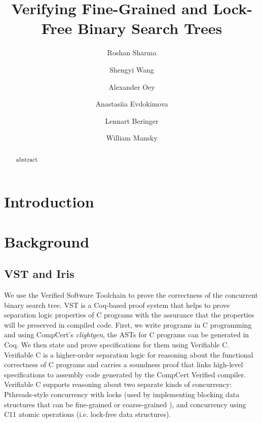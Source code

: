 \documentclass[a4paper,USenglish,cleveref, autoref, thm-restate]{lipics-v2021}
\title{Verifying Fine-Grained and Lock-Free Binary Search Trees}
\author{Roshan Sharma}{University of Illinois at Chicago, USA}{}{}{}
\author{Shengyi Wang}{Princeton University, USA}{}{}{}
\author{Alexander Oey}{, USA}{}{}{}
\author{Anastasiia Evdokimova}{University of Illinois at Chicago, USA}{}{}{}
\author{Lennart Beringer}{Princeton University, USA}{}{}{}
\author{William Mansky}{University of Illinois at Chicago, USA}{}{}{}
\begin{document}
\maketitle

\begin{abstract}
abstract
\end{abstract}


\section{Introduction}


\section{Background}
\label{background}
\subsection{VST and Iris}

We use the Verified Software Toolchain \cite{plfcc}  to prove the correctness of the concurrent binary search tree. VST is a Coq-based proof system that helps to prove separation logic properties of C programs with the assurance that the properties will be preserved in compiled code. First, we write programs in C programming and using CompCert’s \emph{clightgen}, the ASTs for C programs can be generated in Coq. We then state and prove specifications for them using Verifiable C. Verifiable C is a higher-order separation logic for reasoning about the functional correctness of C programs and carries a soundness proof that links high-level specifications to assembly code generated by the CompCert Verified compiler. Verifiable C supports reasoning about two separate kinds of concurrency:  Pthreads-style concurrency with locks (used by implementing blocking data structures that can be fine-grained or coarse-grained ), and concurrency using C11 atomic operations (i.e. lock-free data structures). 
\end{document}

